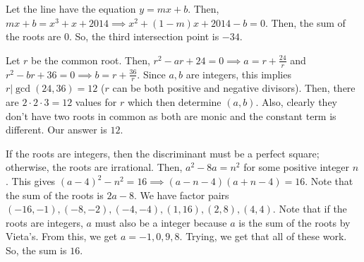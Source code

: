 \documentclass[11pt]{article}
\begin{document}

\begin{sol}
Let the line have the equation $y=mx+b$. Then, $mx+b=x^3+x+2014\implies x^2+(1-m)x+2014-b=0$. Then, the sum of the roots are $0$. So, the third intersection point is $\boxed{-34}$.
\end{sol}


\begin{sol}
Let $r$ be the common root. Then, $r^2-ar+24=0\implies a = r + \frac{24}{r}$ and $r^2-br+36=0\implies b = r + \frac{36}{r}$. Since $a,b$ are integers, this implies $r|\gcd(24,36)=12$ ($r$ can be both positive and negative divisors). Then, there are $2\cdot 2\cdot 3 =12$ values for $r$ which then determine $(a,b)$. Also, clearly they don't have two roots in common as both are monic and the constant term is different. Our answer is $\boxed{12}$.
\end{sol}


\begin{sol}
If the roots are integers, then the discriminant must be a perfect square; otherwise, the roots are irrational. Then, $a^2-8a=n^2$ for some positive integer $n$. This gives $(a-4)^2-n^2=16\implies (a-n-4)(a+n-4)=16$. Note that the sum of the roots is $2a-8$. We have factor pairs $(-16,-1),(-8,-2),(-4,-4),(1,16),(2,8),(4,4)$. Note that if the roots are integers, $a$ must also be a integer because $a$ is the sum of the roots by Vieta's. From this, we get $a=-1, 0, 9, 8$. Trying, we get that all of these work. So, the sum is $\boxed{16}$.
\end{sol}


\end{document}
